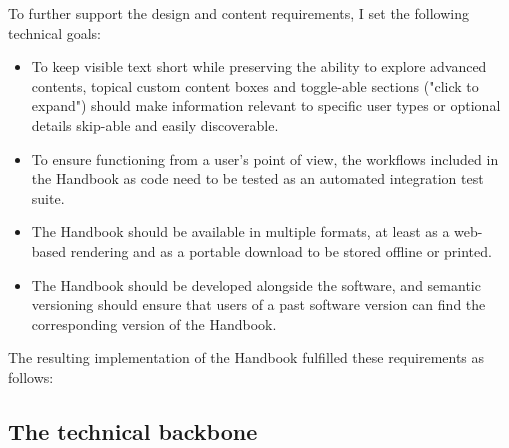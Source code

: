 To further support the design and content requirements, I set the following technical goals:

\begin{itemize}
	\item To keep visible text short while preserving the ability to explore advanced contents, topical custom content boxes and toggle-able sections ("click to expand") should make information relevant to specific user types or optional details skip-able and easily discoverable.
	\item To ensure functioning from a user's point of view, the workflows included in the Handbook as code need to be tested as an automated integration test suite.
	\item The Handbook should be available in multiple formats, at least as a web-based rendering and as a portable download to be stored offline or printed.
	\item The Handbook should be developed alongside the software, and semantic versioning should ensure that users of a past software version can find the corresponding version of the Handbook.
\end{itemize}

The resulting implementation of the Handbook fulfilled these requirements as follows:


\subsection{The technical backbone}

